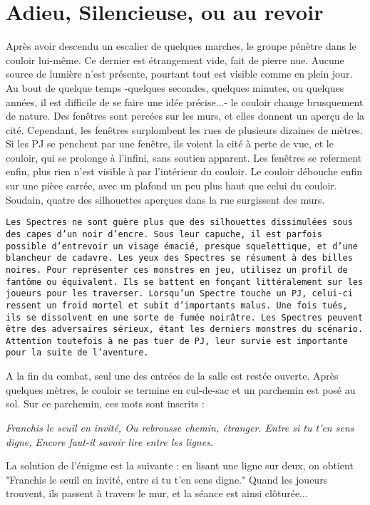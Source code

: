 \documentclass[a4paper]{article}
\begin{document}
\section{Adieu, Silencieuse, ou au revoir}
Après avoir descendu un escalier de quelques marches, le groupe pénètre dans le couloir lui-même. Ce dernier est étrangement vide, fait de pierre nue. Aucune source de lumière n'est présente, pourtant tout est visible comme en plein jour. Au bout de quelque temps -quelques secondes, quelques minutes, ou quelques années, il est difficile de se faire une idée précise...- le couloir change brusquement de nature. Des fenêtres sont percées sur les murs, et elles donnent un aperçu de la cité. Cependant, les fenêtres surplombent les rues de plusieurs dizaines de mètres. Si les PJ se penchent par une fenêtre, ils voient la cité à perte de vue, et le couloir, qui se prolonge à l'infini, sans soutien apparent. Les fenêtres se referment enfin, plus rien n'est visible à par l'intérieur du couloir. Le couloir débouche enfin sur une pièce carrée, avec un plafond un peu plus haut que celui du couloir. Soudain, quatre des silhouettes aperçues dans la rue surgissent des murs.
\begin{flushright}
\texttt{Les Spectres ne sont guère plus que des silhouettes dissimulées sous des capes d'un noir d'encre. Sous leur capuche, il est parfois possible d'entrevoir un visage émacié, presque squelettique, et d'une blancheur de cadavre. Les yeux des Spectres se résument à des billes noires. Pour représenter ces monstres en jeu, utilisez un profil de fantôme ou équivalent. Ils se battent en fonçant littéralement sur les joueurs pour les traverser. Lorsqu'un Spectre touche un PJ, celui-ci ressent un froid mortel et subit d'importants malus. Une fois tués, ils se dissolvent en une sorte de fumée noirâtre. Les Spectres peuvent être des adversaires sérieux, étant les derniers monstres du scénario. Attention toutefois à ne pas tuer de PJ, leur survie est importante pour la suite de l'aventure.}
\end{flushright}
A la fin du combat, seul une des entrées de la salle est restée ouverte. Après quelques mètres, le couloir se termine en cul-de-sac et un parchemin est posé au sol. Sur ce parchemin, ces mots sont inscrits :
\begin{center}
\emph{Franchis le seuil en invité,
\newline
Ou rebrousse chemin, étranger.
\newline
Entre si tu t'en sens digne,
\newline
Encore faut-il savoir lire entre les lignes.}
\end{center}
La solution de l'énigme est la suivante : en lisant une ligne sur deux, on obtient "Franchis le seuil en invité, entre si tu t'en sens digne." Quand les joueurs trouvent, ils passent à travers le mur, et la séance est ainsi clôturée...
\end{document}
